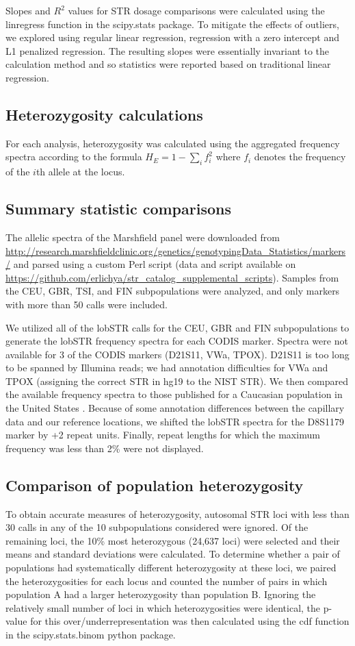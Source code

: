 Slopes and $R^2$ values for STR dosage comparisons were calculated using the linregress function in the scipy.stats package.  To mitigate the effects of outliers, we explored using regular linear regression, regression with a zero intercept and L1 penalized regression. The resulting slopes were essentially invariant to the calculation method and so statistics were reported based on traditional linear regression.  

\subsection{Heterozygosity calculations}
For each analysis, heterozygosity was calculated using the aggregated frequency spectra according to the formula $H_E = 1-\sum_i f_i^2$ where $f_i$ denotes the frequency of the $i$th allele at the locus.

\subsection{Summary statistic comparisons}
The allelic spectra of the Marshfield panel were downloaded from \url{http://research.marshfieldclinic.org/genetics/genotypingData_Statistics/markers/} and parsed using a custom Perl script (data and script available on \url{https://github.com/erlichya/str_catalog_supplemental_scripts}). Samples from the CEU, GBR, TSI, and FIN subpopulations were analyzed, and only markers with more than 50 calls were included.

We utilized all of the lobSTR calls for the CEU, GBR and FIN subpopulations to generate the lobSTR frequency spectra for each CODIS marker. Spectra were not available for 3 of the CODIS markers (D21S11, VWa, TPOX). D21S11 is too long to be spanned by Illumina reads; we had annotation difficulties for VWa and TPOX (assigning the correct STR in hg19 to the NIST STR). We then compared the available frequency spectra to those published for a Caucasian population in the United States \cite{BudowleSheaNiezgodaEtAl2001} . Because of some annotation differences between the capillary data and our reference locations, we shifted the lobSTR spectra for the D8S1179 marker by +2 repeat units. Finally, repeat lengths for which the maximum frequency was less than 2\% were not displayed. 

\subsection{Comparison of population heterozygosity}
To obtain accurate measures of heterozygosity, autosomal STR loci with less than 30 calls in any of the 10 subpopulations considered were ignored. Of the remaining loci, the 10\% most heterozygous (24,637 loci) were selected and their means and standard deviations were calculated. To determine whether a pair of populations had systematically different heterozygosity at these loci, we paired the heterozygosities for each locus and counted the number of pairs in which population A had a larger heterozygosity than population B. Ignoring the relatively small number of loci in which heterozygosities were identical, the p-value for this over/underrepresentation was then calculated using the cdf function in the scipy.stats.binom python package.  


